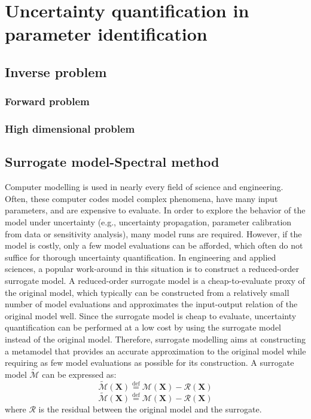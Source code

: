 \chapter{Uncertainty quantification in parameter identification}

\label{UQ}
\section{Inverse problem}
\subsection{Forward problem}

\subsection{High dimensional problem}

\section{Surrogate model-Spectral method}

Computer modelling is used in nearly every field of science and engineering. Often, these computer codes model complex phenomena, have many input parameters,
and are expensive to evaluate. In order to explore the behavior of the model under uncertainty (e.g., uncertainty propagation, parameter calibration from data or sensitivity analysis), many
model runs are required. However, if the model is costly, only a few model evaluations can be afforded, which often do not suffice for thorough uncertainty quantification. In engineering and applied sciences, a popular work-around in this situation is to construct a reduced-order surrogate model. A reduced-order surrogate model is a cheap-to-evaluate proxy of the original model, which typically can be constructed from a relatively small number of model evaluations and approximates
the input-output relation of the original model well. Since the surrogate model is cheap to evaluate, uncertainty quantification can be performed at a low cost by using the surrogate
model instead of the original model. Therefore, surrogate modelling aims at constructing a metamodel that provides an accurate approximation to the original model while requiring as few model evaluations as possible for its construction. A surrogate model $\tilde{\mathcal{M}}$ can be expressed as:
\begin{equation}
\label{eq:surrogate_model}
    \tilde{\mathcal{M}}(\boldsymbol{X})  \overset{\mathrm{def}}{=} \mathcal{M}(\boldsymbol{X}) - \mathcal{R}(\boldsymbol{X})
\end{equation}
\begin{equation}
\label{eq:surrogate_model}
    \tilde{\mathcal{M}}(\boldsymbol{X})  \overset{\mathrm{def}}{=} \mathcal{M}(\boldsymbol{X}) - \mathcal{R}(\boldsymbol{X})
\end{equation}
where $\mathcal{R}$ is the residual between the original model and the surrogate.

